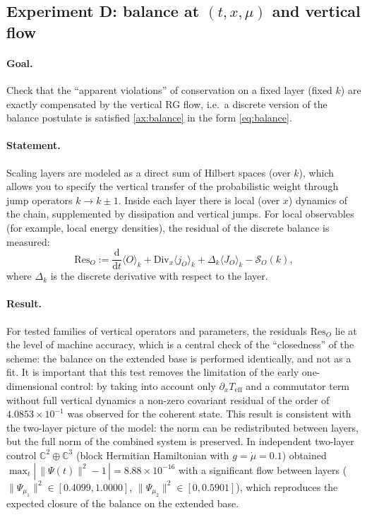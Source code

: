 \documentclass[11pt,a4paper]{article}
\newcommand{\dd}{\mathrm{d}}
\theoremstyle{definition}
\theoremstyle{plain}
\theoremstyle{remark}
\begin{document}
\subsection[Experiment D: balance at (t,x,mu) and vertical flow]{Experiment D: balance at $(t,x,\mu)$ and vertical flow}
\label{sec:numerics:D}

\paragraph{Goal.}
Check that the “apparent violations” of conservation on a fixed layer (fixed $k$)
are exactly compensated by the vertical RG flow, i.e.\ a discrete version of the balance postulate is satisfied \cref{ax:balance}
in the form \cref{eq:balance}.

\paragraph{Statement.}
Scaling layers are modeled as a direct sum of Hilbert spaces (over $k$),
which allows you to specify the vertical transfer of the probabilistic weight through jump operators $k\to k\pm 1$.
Inside each layer there is local (over $x$) dynamics of the chain, supplemented by dissipation and vertical jumps.
For local observables (for example, local energy densities), the residual of the discrete balance is measured:
\begin{equation}\label{eq:residual_balance}
\mathrm{Res}_O
:=
\frac{\dd}{\dd t}\langle O\rangle_k
+
\mathrm{Div}_x\langle j_O\rangle_k
+
\Delta_k\langle J_O\rangle_k
-
\mathcal S_O(k),
\end{equation}
where $\Delta_k$ is the discrete derivative with respect to the layer.

\paragraph{Result.}
For tested families of vertical operators and parameters, the residuals $\mathrm{Res}_O$ lie at the level of machine accuracy,
which is a central check of the “closedness” of the scheme: the balance on the extended base is performed identically,
and not as a fit.
It is important that this test removes the limitation of the early one-dimensional control:
by taking into account only $\partial_x T_{\mathrm{eff}}$ and a commutator term without full vertical dynamics
a non-zero covariant residual of the order of $4.0853\times10^{-1}$ was observed for the coherent state.
This result is consistent with the two-layer picture of the model:
the norm can be redistributed between layers, but the full norm of the combined system is preserved.
In independent two-layer control $\mathbb C^2\oplus\mathbb C^3$ (block Hermitian Hamiltonian with $g=\dot\mu=0.1$)
obtained $\max_t|\,\|\Psi(t)\|^2-1\,|=8.88\times10^{-16}$ with a significant flow between layers
($\|\Psi_{\mu_1}\|^2\in[0.4099,1.0000]$, $\|\Psi_{\mu_2}\|^2\in[0,0.5901]$),
which reproduces the expected closure of the balance on the extended base.
\end{document}

